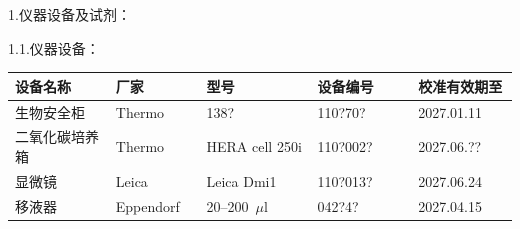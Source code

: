 \documentclass[UTF8,10pt,a4paper,fontset=fandol]{ctexart}
\newcommand{\fieldvalue}[1]{#1}
\newcommand{\handwritten}[1]{#1}
\begin{document}
\medskip

1.\quad 仪器设备及试剂：

1.1.\quad 仪器设备：

\begin{tabular}{|p{0.20\linewidth}|p{0.18\linewidth}|p{0.22\linewidth}|p{0.20\linewidth}|p{0.20\linewidth}|}
\hline
设备名称 & 厂家 & 型号 & 设备编号 & 校准有效期至 \\ \hline
\fieldvalue{生物安全柜} &
\fieldvalue{Thermo} &
\fieldvalue{\handwritten{138?}} &
\fieldvalue{\handwritten{110?70?}} &
\fieldvalue{\handwritten{2027.01.11}} \\ \hline
\fieldvalue{二氧化碳培养箱} &
\fieldvalue{Thermo} &
\fieldvalue{HERA cell 250i} &
\fieldvalue{\handwritten{110?002?}} &
\fieldvalue{\handwritten{2027.06.??}} \\ \hline
\fieldvalue{显微镜} &
\fieldvalue{Leica} &
\fieldvalue{Leica Dmi1} &
\fieldvalue{\handwritten{110?013?}} &
\fieldvalue{\handwritten{2027.06.24}} \\ \hline
\fieldvalue{移液器} &
\fieldvalue{Eppendorf} &
\fieldvalue{\handwritten{20--200~$\mu$l}} &
\fieldvalue{\handwritten{042?4?}} &
\fieldvalue{\handwritten{2027.04.15}} \\ \hline
\end{tabular}
\end{document}
